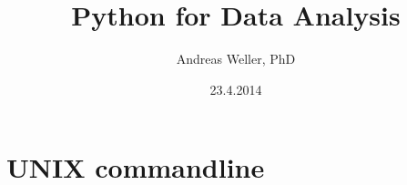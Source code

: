 \documentclass[]{beamer}
\title[]{Python for Data Analysis} %
\author{Andreas Weller, PhD} %
\institute[WTCHG] %
{WTCHG - NHS %
}
\date{23.4.2014} %
\begin{document}
\begin{frame}
\titlepage %
\end{frame}



\section{UNIX commandline} %


\end{document}

